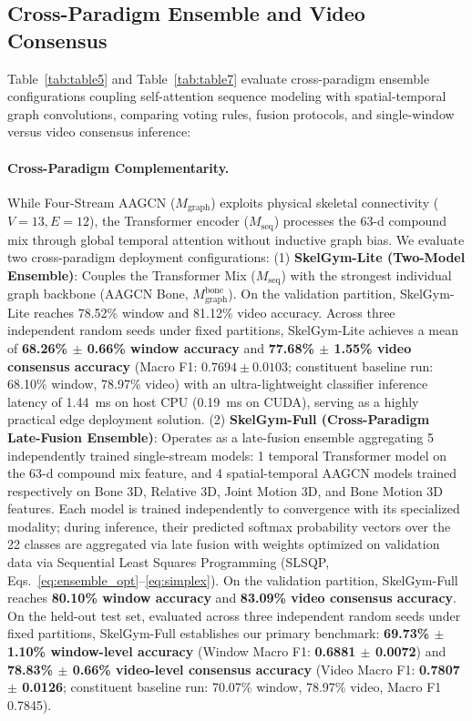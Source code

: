 \documentclass[runningheads]{llncs}
\begin{document}
\subsection{Cross-Paradigm Ensemble and Video Consensus}
Table~\ref{tab:table5} and Table~\ref{tab:table7} evaluate cross-paradigm ensemble configurations coupling self-attention sequence modeling with spatial-temporal graph convolutions, comparing voting rules, fusion protocols, and single-window versus video consensus inference:

\paragraph{Cross-Paradigm Complementarity.} While Four-Stream AAGCN ($M_{\text{graph}}$) exploits physical skeletal connectivity ($V=13, E=12$), the Transformer encoder ($M_{\text{seq}}$) processes the 63-d compound mix through global temporal attention without inductive graph bias. We evaluate two cross-paradigm deployment configurations:
(1) \textbf{SkelGym-Lite (Two-Model Ensemble)}: Couples the Transformer Mix ($M_{\text{seq}}$) with the strongest individual graph backbone (AAGCN Bone, $M_{\text{graph}}^{\text{bone}}$). On the validation partition, SkelGym-Lite reaches 78.52\% window and 81.12\% video accuracy. Across three independent random seeds under fixed partitions, SkelGym-Lite achieves a mean of \textbf{68.26\% $\pm$ 0.66\% window accuracy} and \textbf{77.68\% $\pm$ 1.55\% video consensus accuracy} (Macro F1: $0.7694 \pm 0.0103$; constituent baseline run: 68.10\% window, 78.97\% video) with an ultra-lightweight classifier inference latency of 1.44~ms on host CPU (0.19~ms on CUDA), serving as a highly practical edge deployment solution.
(2) \textbf{SkelGym-Full (Cross-Paradigm Late-Fusion Ensemble)}: Operates as a late-fusion ensemble aggregating 5 independently trained single-stream models: 1 temporal Transformer model on the 63-d compound mix feature, and 4 spatial-temporal AAGCN models trained respectively on Bone 3D, Relative 3D, Joint Motion 3D, and Bone Motion 3D features. Each model is trained independently to convergence with its specialized modality; during inference, their predicted softmax probability vectors over the 22 classes are aggregated via late fusion with weights optimized on validation data via Sequential Least Squares Programming (SLSQP, Eqs.~\eqref{eq:ensemble_opt}--\eqref{eq:simplex}). On the validation partition, SkelGym-Full reaches \textbf{80.10\% window accuracy} and \textbf{83.09\% video consensus accuracy}. On the held-out test set, evaluated across three independent random seeds under fixed partitions, SkelGym-Full establishes our primary benchmark: \textbf{69.73\% $\pm$ 1.10\% window-level accuracy} (Window Macro F1: \textbf{0.6881 $\pm$ 0.0072}) and \textbf{78.83\% $\pm$ 0.66\% video-level consensus accuracy} (Video Macro F1: \textbf{0.7807 $\pm$ 0.0126}; constituent baseline run: 70.07\% window, 78.97\% video, Macro F1 0.7845).
\end{document}
